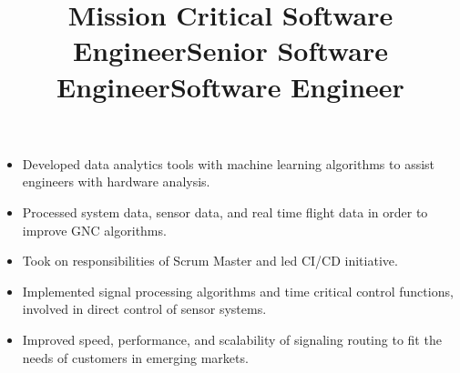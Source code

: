 \documentclass[margin]{res}
\begin{document}
\begin{resume}
\title{\textbf{Mission Critical Software Engineer}}
\begin{position}
\begin{itemize}[noitemsep, topsep=0pt]
\item Developed data analytics tools with machine learning algorithms to assist engineers with hardware analysis. 
\item Processed system data, sensor data, and real time flight data in order to improve GNC algorithms. 
\item Took on responsibilities of Scrum Master and led CI/CD initiative. 
\end{itemize}
\end{position}

\title{\textbf{Senior Software Engineer}}
\begin{position}
\begin{itemize}[noitemsep, topsep=0pt]
\item Implemented signal processing algorithms and time critical control functions, involved in direct control of sensor systems. 
\end{itemize}
\end{position}

\title{\textbf{Software Engineer}}
\begin{position}
\begin{itemize}[noitemsep, topsep=0pt]
\item Improved speed, performance, and scalability of signaling routing to fit the needs of customers in emerging markets. 
\end{itemize}
\end{position}


\end{resume}
\end{document}
